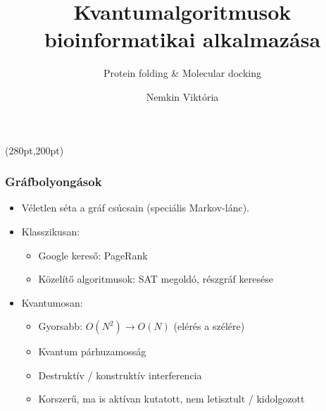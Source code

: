 \documentclass[aspectratio=169]{beamer}
\author[Nemkin Viktória]{Nemkin Viktória}
\institute[]{
\begin{small}dr. Friedl Katalin\end{small}\\
\begin{footnotesize}Számítástudományi és Információelméleti Tanszék\end{footnotesize}
}
\title{Kvantumalgoritmusok bioinformatikai alkalmazása}
\subtitle{Protein folding \& Molecular docking}
\date{}
\begin{document}
\begin{frame}
\titlepage

\begin{textblock*}{150pt}(280pt,200pt) %

\end{textblock*}
\end{frame}

\begin{frame}
  \frametitle{Gráfbolyongások}
  
  \begin{itemize}
    \item Véletlen séta a gráf csúcsain (speciális Markov-lánc).
    \item Klasszikusan:
    \begin{itemize}
        \item Google kereső: PageRank
        \item Közelítő algoritmusok: SAT megoldó, részgráf keresése
    \end{itemize}
    \item Kvantumosan:
    \begin{itemize}
        \item Gyorsabb: $O(N^2) \rightarrow O(N)$ (elérés a szélére)
        \item Kvantum párhuzamosság
        \item Destruktív / konstruktív interferencia
        \item Korszerű, ma is aktívan kutatott, nem letisztult / kidolgozott
    \end{itemize}
  \end{itemize}
\end{frame}
\end{document}
